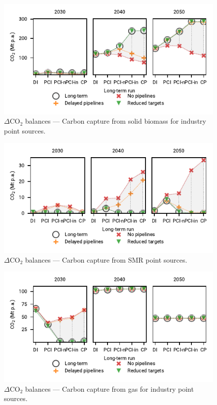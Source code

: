 \documentclass[pdflatex,sn-nature]{sn-jnl}
\theoremstyle{thmstyleone}%
\theoremstyle{thmstyletwo}%
\theoremstyle{thmstylethree}%
\begin{document}
\begin{appendices}
\begin{figure}[htbp]
  \centering
  \includegraphics{figures/delta_balances_solid_biomass_for_industry_CC}
  \caption{$\Delta$CO$_2$ balances --- Carbon capture from solid biomass for industry point sources.}
  \label{fig:delta_balances_biomass_industry_cc}
\end{figure}

\begin{figure}[htbp]
  \centering
  \includegraphics{figures/delta_balances_SMR_CC}
  \caption{$\Delta$CO$_2$ balances --- Carbon capture from SMR point sources.}
  \label{fig:delta_balances_smr_cc}
\end{figure}

\begin{figure}[htbp]
  \centering
  \includegraphics{figures/delta_balances_gas_for_industry_CC}
  \caption{$\Delta$CO$_2$ balances --- Carbon capture from gas for industry point sources.}
  \label{fig:delta_balances_gas_for_industry}
\end{figure}


\end{appendices}
\end{document}
